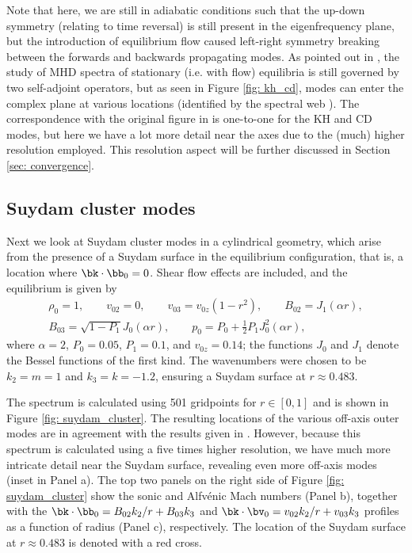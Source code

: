 Note that here, we are still in adiabatic conditions such that the up-down symmetry (relating to time reversal) is still present in the eigenfrequency plane, but the introduction of equilibrium flow caused left-right symmetry breaking between the forwards and backwards propagating modes. As pointed out in \citet{goedbloed2018_web1}, the study of MHD spectra of stationary (i.e. with flow) equilibria is still governed by two self-adjoint operators, but as seen in Figure \ref{fig: kh_cd}, modes can enter the complex plane at various locations (identified by the spectral web \citep{goedbloed2018_web2}). The correspondence with the original figure in \citet{baty2002} is one-to-one for the KH and CD modes, but here we have a lot more detail near the axes due to the (much) higher resolution employed. This resolution aspect will be further discussed in Section \ref{sec: convergence}.

\subsection{Suydam cluster modes}
Next we look at Suydam cluster modes in a cylindrical geometry, which arise from the presence of a Suydam surface in the equilibrium configuration, that is, a location where $\bk \cdot \bb_0 = 0$. Shear flow effects are included, and the equilibrium is given by
\begin{equation} \label{eq: suydam_equilibrium}
  \begin{gathered}
    \rho_0 = 1,
    \qquad
    v_{02} = 0,
    \qquad
    v_{03} = v_{0z}\left(1 - r^2\right),
    \qquad
    B_{02} = J_1(\alpha r), \\
    B_{03} = \sqrt{1 - P_1}J_0(\alpha r),
    \qquad
    p_0 = P_0 + \frac{1}{2}P_1 J_0^2(\alpha r),
  \end{gathered}
\end{equation}
where $\alpha = 2$, $P_0 = 0.05$, $P_1 = 0.1$, and $v_{0z} = 0.14$; the functions $J_0$ and $J_1$ denote the Bessel functions of the first kind. The wavenumbers were chosen to be $k_2 = m = 1$ and $k_3 = k = -1.2$, ensuring a Suydam surface at $r \approx 0.483$.

The spectrum is calculated using 501 gridpoints for $r \in [0, 1]$ and is shown in Figure \ref{fig: suydam_cluster}. The resulting locations of the various off-axis outer modes are in agreement with the results given in \citet{nijboer1997}. However, because this spectrum is calculated using a five times higher resolution, we have much more intricate detail near the Suydam surface, revealing even more off-axis modes (inset in Panel a). The top two panels on the right side of Figure \ref{fig: suydam_cluster} show the sonic and Alfv\'enic Mach numbers (Panel b), together with the $\bk \cdot \bb_0 = B_{02}k_2/r + B_{03}k_3$ and $\bk \cdot \bv_0 = v_{02}k_2/r + v_{03}k_3$ profiles as a function of radius (Panel c), respectively. The location of the Suydam surface at $r \approx 0.483$ is denoted with a red cross.

